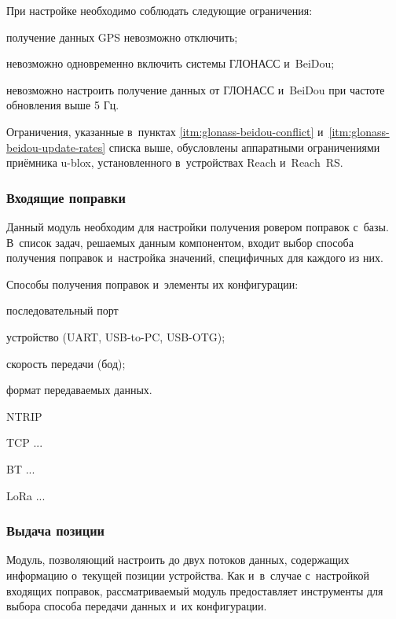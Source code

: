 При настройке необходимо соблюдать следующие ограничения:
\begin{alphitemize}
  \item получение данных GPS невозможно отключить;
  \item \label{itm:glonass-beidou-conflict} невозможно одновременно включить системы ГЛОНАСС и~BeiDou;
  \item \label{itm:glonass-beidou-update-rates} невозможно настроить получение данных от ГЛОНАСС и~BeiDou при частоте обновления выше 5 Гц.
\end{alphitemize}

Ограничения, указанные в~пунктах \ref{itm:glonass-beidou-conflict} и~\ref{itm:glonass-beidou-update-rates} списка выше, обусловлены аппаратными ограничениями приёмника u-blox, установленного в~устройствах Reach и~Reach~RS.

\subsubsection{Входящие поправки}

Данный модуль необходим для настройки получения ровером поправок с~базы. В~список задач, решаемых данным компонентом, входит выбор способа получения поправок и~настройка значений, специфичных для каждого из них.

Способы получения поправок и~элементы их конфигурации:
\begin{dashitemize}
  \item последовательный порт
  \begin{dashitemize}
    \item устройство (UART, USB-to-PC, USB-OTG);
    \item скорость передачи (бод);
    \item формат передаваемых данных.
  \end{dashitemize}

  \item NTRIP
  \item TCP ...
  \item BT ...
  \item LoRa ...
\end{dashitemize}

\subsubsection{Выдача позиции}

Модуль, позволяющий настроить до двух потоков данных, содержащих информацию о~текущей позиции устройства. Как и~в~случае с~настройкой входящих поправок, рассматриваемый модуль предоставляет инструменты для выбора способа передачи данных и~их конфигурации.

